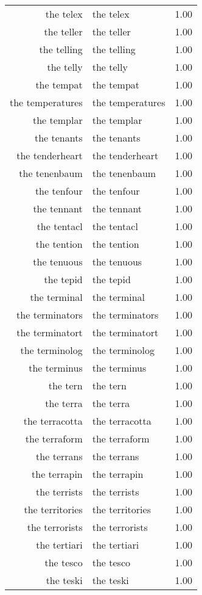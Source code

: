 \begin{table}[ht]
\begin{tabular}{rlr}
  the telex & the telex & 1.00 \\ 
  the teller & the teller & 1.00 \\ 
  the telling & the telling & 1.00 \\ 
  the telly & the telly & 1.00 \\ 
  the tempat & the tempat & 1.00 \\ 
  the temperatures & the temperatures & 1.00 \\ 
  the templar & the templar & 1.00 \\ 
  the tenants & the tenants & 1.00 \\ 
  the tenderheart & the tenderheart & 1.00 \\ 
  the tenenbaum & the tenenbaum & 1.00 \\ 
  the tenfour & the tenfour & 1.00 \\ 
  the tennant & the tennant & 1.00 \\ 
  the tentacl & the tentacl & 1.00 \\ 
  the tention & the tention & 1.00 \\ 
  the tenuous & the tenuous & 1.00 \\ 
  the tepid & the tepid & 1.00 \\ 
  the terminal & the terminal & 1.00 \\ 
  the terminators & the terminators & 1.00 \\ 
  the terminatort & the terminatort & 1.00 \\ 
  the terminolog & the terminolog & 1.00 \\ 
  the terminus & the terminus & 1.00 \\ 
  the tern & the tern & 1.00 \\ 
  the terra & the terra & 1.00 \\ 
  the terracotta & the terracotta & 1.00 \\ 
  the terraform & the terraform & 1.00 \\ 
  the terrans & the terrans & 1.00 \\ 
  the terrapin & the terrapin & 1.00 \\ 
  the terrists & the terrists & 1.00 \\ 
  the territories & the territories & 1.00 \\ 
  the terrorists & the terrorists & 1.00 \\ 
  the tertiari & the tertiari & 1.00 \\ 
  the tesco & the tesco & 1.00 \\ 
  the teski & the teski & 1.00 \\ 

\end{tabular}
\end{table}
